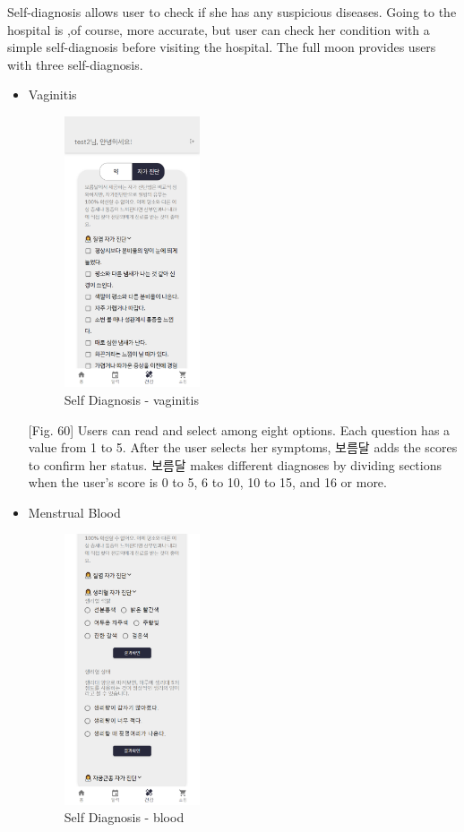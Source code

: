 \documentclass[conference]{IEEEtran}
\begin{document}
\begin{itemize}
    Self-diagnosis allows user to check if she has any suspicious diseases. Going to the hospital is ,of course, more accurate, but user can check her condition with a simple self-diagnosis before visiting the hospital. The full moon provides users with three self-diagnosis.
    \begin{itemize}
        \item Vaginitis
        \begin{figure}[ht]
        \includegraphics[width=4cm, height=8cm, center]{vaginitis.png}
        \caption{Self Diagnosis - vaginitis}
        \label{fig60}
        \end{figure}
        [Fig. 60] Users can read and select among eight options. Each question has a value from 1 to 5. After the user selects her symptoms, 보름달 adds the scores to confirm her status. 보름달 makes different diagnoses by dividing sections when the user's score is 0 to 5, 6 to 10, 10 to 15, and 16 or more.
        \item Menstrual Blood
        \begin{figure}[ht]
        \includegraphics[width=4cm, height=8cm, center]{bloodcolor.png}
        \caption{Self Diagnosis - blood}
        \label{fig61}
        \end{figure}


\end{itemize}
\end{itemize}
\end{document}
